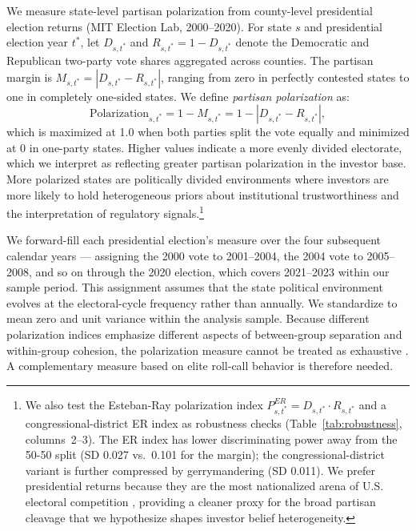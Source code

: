 \documentclass[12pt]{article}
\begin{document}
We measure state-level partisan polarization from county-level presidential
election returns (MIT Election Lab, 2000--2020). For state $s$ and presidential
election year $t^{*}$, let $D_{s,t^{*}}$ and $R_{s,t^{*}} = 1 - D_{s,t^{*}}$ denote the
Democratic and Republican two-party vote shares aggregated across counties.
The partisan margin is $M_{s,t^{*}} = |D_{s,t^{*}} - R_{s,t^{*}}|$, ranging from zero in
perfectly contested states to one in completely one-sided states. We define
\emph{partisan polarization} as:
\begin{equation}
    \label{eq:comp}
    \text{Polarization}_{s,t^{*}} = 1 - M_{s,t^{*}} = 1 - |D_{s,t^{*}} - R_{s,t^{*}}|,
\end{equation}
which is maximized at 1.0 when both parties split the vote equally and
minimized at 0 in one-party states. Higher values indicate a more evenly
divided electorate, which we interpret as reflecting greater partisan
polarization in the investor base. More polarized
states are politically divided environments where investors are more
likely to hold heterogeneous priors
about institutional trustworthiness and the interpretation of regulatory
signals.\footnote{We also test the Esteban-Ray polarization index
$P^{ER}_{s,t^{*}} = D_{s,t^{*}} \cdot R_{s,t^{*}}$ and a congressional-district
ER index as robustness checks (Table~\ref{tab:robustness}, columns~2--3).
The ER index has lower discriminating power away from the 50-50 split
(SD 0.027 vs.\ 0.101 for the margin); the congressional-district variant
is further compressed by gerrymandering (SD 0.011). We prefer presidential
returns because they are the most nationalized arena of U.S. electoral
competition \citep{vertz1987, abramowitz2016}, providing a cleaner proxy
for the broad partisan cleavage that we hypothesize shapes investor
belief heterogeneity.}

We forward-fill each presidential election's measure over the four subsequent
calendar years --- assigning the 2000 vote to 2001--2004, the 2004 vote to
2005--2008, and so on through the 2020 election, which covers 2021--2023
within our sample period. This assignment assumes that the state political
environment evolves at the electoral-cycle frequency rather than annually. We standardize to mean zero and unit variance
within the analysis sample. Because different polarization indices emphasize
different aspects of between-group separation and within-group cohesion, the
polarization measure cannot be treated as exhaustive \citep{wang2000}.
A complementary measure based on elite roll-call behavior is therefore needed.
\end{document}
